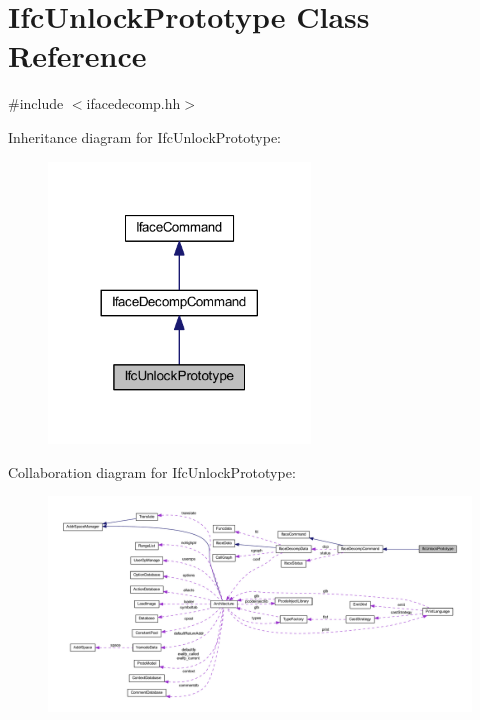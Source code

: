 \hypertarget{class_ifc_unlock_prototype}{}\section{Ifc\+Unlock\+Prototype Class Reference}
\label{class_ifc_unlock_prototype}


{\ttfamily \#include $<$ifacedecomp.\+hh$>$}



Inheritance diagram for Ifc\+Unlock\+Prototype\+:
\nopagebreak
\begin{figure}[H]
\begin{center}
\leavevmode
\includegraphics[width=197pt]{class_ifc_unlock_prototype__inherit__graph}
\end{center}
\end{figure}


Collaboration diagram for Ifc\+Unlock\+Prototype\+:
\nopagebreak
\begin{figure}[H]
\begin{center}
\leavevmode
\includegraphics[width=350pt]{class_ifc_unlock_prototype__coll__graph}
\end{center}
\end{figure}
